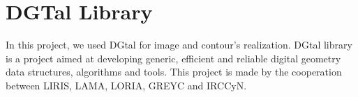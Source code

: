 \section{DGTal Library}

In this project, we used DGtal for image and contour's realization. DGtal library is a project aimed at developing generic, efficient and reliable digital geometry data structures, algorithms and tools. This project is made by the cooperation between LIRIS, LAMA, LORIA, GREYC and IRCCyN. 